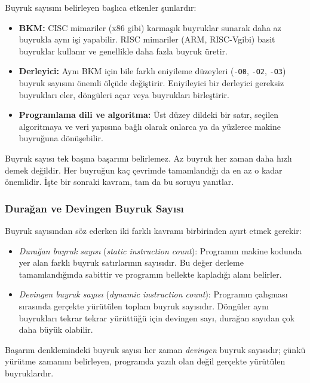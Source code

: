 Buyruk sayısını belirleyen başlıca etkenler şunlardır:
\begin{itemize}
    \item \textbf{BKM:} CISC mimariler (x86 gibi) karmaşık buyruklar sunarak daha az buyrukla aynı işi yapabilir. RISC mimariler (ARM, RISC-V\@ gibi) basit buyruklar kullanır ve genellikle daha fazla buyruk üretir.
    \item \textbf{Derleyici:} Aynı BKM için bile farklı eniyileme düzeyleri (\texttt{-O0}, \texttt{-O2}, \texttt{-O3}) buyruk sayısını önemli ölçüde değiştirir. Eniyileyici bir derleyici gereksiz buyrukları eler, döngüleri açar veya buyrukları birleştirir.
    \item \textbf{Programlama dili ve algoritma:} Üst düzey dildeki bir satır, seçilen algoritmaya ve veri yapısına bağlı olarak onlarca ya da yüzlerce makine buyruğuna dönüşebilir.
\end{itemize}

Buyruk sayısı tek başına başarımı belirlemez. Az buyruk her zaman daha hızlı demek değildir. Her buyruğun kaç çevrimde tamamlandığı da en az o kadar önemlidir. İşte bir sonraki kavram, tam da bu soruyu yanıtlar.

\subsubsection{Durağan ve Devingen Buyruk Sayısı}
\label{subsec:duragan-devingen}

Buyruk sayısından söz ederken iki farklı kavramı birbirinden ayırt etmek gerekir:

\begin{itemize}
    \item \emph{Durağan buyruk sayısı} (\textit{static instruction count}): Programın makine kodunda yer alan farklı buyruk satırlarının sayısıdır. Bu değer derleme tamamlandığında sabittir ve programın bellekte kapladığı alanı belirler.
    \item \emph{Devingen buyruk sayısı} (\textit{dynamic instruction count}): Programın çalışması sırasında gerçekte yürütülen toplam buyruk sayısıdır. Döngüler aynı buyrukları tekrar tekrar yürüttüğü için devingen sayı, durağan sayıdan çok daha büyük olabilir.
\end{itemize}

Başarım denklemindeki buyruk sayısı her zaman \emph{devingen} buyruk sayısıdır; çünkü yürütme zamanını belirleyen, programda yazılı olan değil gerçekte yürütülen buyruklardır.

